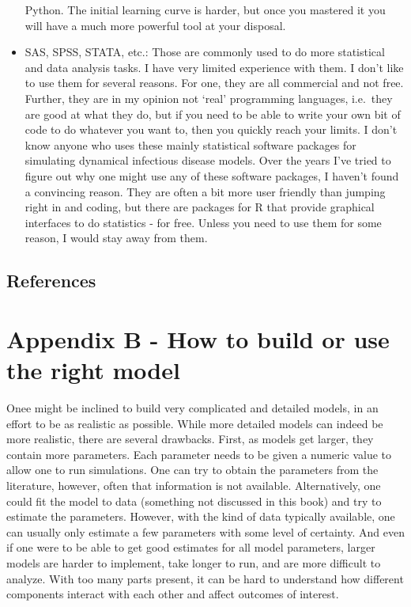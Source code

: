 \documentclass[]{book}
\theoremstyle{definition}
\theoremstyle{definition}
\theoremstyle{definition}
\theoremstyle{remark}
\begin{document}
\begin{itemize}
  Python. The initial learning curve is harder, but once you mastered it
  you will have a much more powerful tool at your disposal.
\item
  SAS, SPSS, STATA, etc.: Those are commonly used to do more statistical
  and data analysis tasks. I have very limited experience with them. I
  don't like to use them for several reasons. For one, they are all
  commercial and not free. Further, they are in my opinion not `real'
  programming languages, i.e.~they are good at what they do, but if you
  need to be able to write your own bit of code to do whatever you want
  to, then you quickly reach your limits. I don't know anyone who uses
  these mainly statistical software packages for simulating dynamical
  infectious disease models. Over the years I've tried to figure out why
  one might use any of these software packages, I haven't found a
  convincing reason. They are often a bit more user friendly than
  jumping right in and coding, but there are packages for R that provide
  graphical interfaces to do statistics - for free. Unless you need to
  use them for some reason, I would stay away from them.
\end{itemize}

\section{References}\label{references-19}

\chapter{Appendix B - How to build or use the right
model}\label{modelcomplexity}

Onee might be inclined to build very complicated and detailed models, in
an effort to be as realistic as possible. While more detailed models can
indeed be more realistic, there are several drawbacks. First, as models
get larger, they contain more parameters. Each parameter needs to be
given a numeric value to allow one to run simulations. One can try to
obtain the parameters from the literature, however, often that
information is not available. Alternatively, one could fit the model to
data (something not discussed in this book) and try to estimate the
parameters. However, with the kind of data typically available, one can
usually only estimate a few parameters with some level of certainty. And
even if one were to be able to get good estimates for all model
parameters, larger models are harder to implement, take longer to run,
and are more difficult to analyze. With too many parts present, it can
be hard to understand how different components interact with each other
and affect outcomes of interest.
\end{document}
